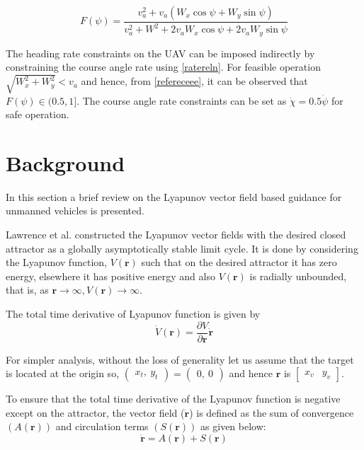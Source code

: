 \documentclass[Afour,sagev,times]{sagej}
\begin{document}
\begin{equation}\label{refereceee}
F(\psi)=\textstyle{\frac{v_a^{2}+v_a(W_x\cos\psi+W_y\sin\psi )}{v_a^{2}+W^{2}+2v_aW_x\cos\psi+2v_aW_y\sin\psi}}
\end{equation}

The heading rate constraints on the UAV can be imposed indirectly by constraining the course angle rate using \eqref{ratereln}. For  feasible operation $\sqrt{W_x^{2}+W_y^{2}}<v_a$ and hence, from \eqref{refereceee}, it can be observed that $F(\psi)\in(0.5,1]$. The course angle rate constraints can be set as $\dot{\chi}=0.5\dot{\psi}$ for safe operation. 


\section{Background}

In this section a brief review on the Lyapunov vector field based guidance for  unmanned vehicles is presented.

Lawrence et al.\cite{lawrence2007lyapunov} constructed the Lyapunov vector fields with the desired closed attractor as a globally asymptotically stable  limit cycle. It is done by considering the Lyapunov function, $V(\boldsymbol{r})$ such that on the desired attractor it has zero energy, elsewhere it has positive energy and also $V(\boldsymbol{r})$ is radially unbounded, that is, as $\boldsymbol{r}\rightarrow \infty , V(\boldsymbol{r})\rightarrow \infty$. 

The total time derivative of Lyapunov function is given by
\begin{equation}
\dot{V}(\boldsymbol{r})=\frac{\partial V}{\partial \boldsymbol{r}}\dot{\boldsymbol{r}}
\end{equation} 

For simpler analysis, without the loss of generality let us assume that the target is located at the origin so, $(\begin{matrix}
x_t,~y_t
\end{matrix})=(\begin{matrix}
0,~0
\end{matrix})$  and hence $\boldsymbol{r}$ is $\begin{bmatrix}
x_{v} &y_{v}
\end{bmatrix}$.

To ensure that the total time derivative of the Lyapunov function  is negative except on the attractor, the vector field ($\dot{\boldsymbol{r}}$) is defined as the sum of convergence $(A(\boldsymbol{r}))$ and circulation terms $(S(\boldsymbol{r}))$ as given below:
\begin{equation}
\dot{\boldsymbol{r}}=A(\boldsymbol{r})+S(\boldsymbol{r})
\end{equation} 
\end{document}
